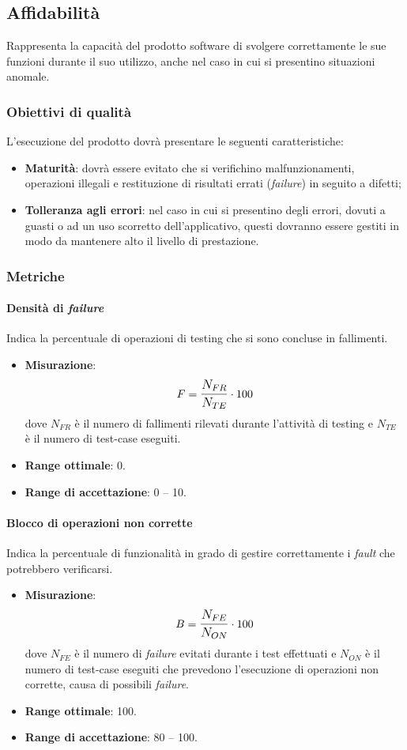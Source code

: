 \subsection{Affidabilità}
Rappresenta la capacità del prodotto software di svolgere correttamente le sue funzioni durante il suo utilizzo, anche nel caso in cui si presentino situazioni anomale.

\subsubsection{Obiettivi di qualità}
L'esecuzione del prodotto dovrà presentare le seguenti caratteristiche:
\begin{itemize}
\item \textbf{Maturità}: dovrà essere evitato che si verifichino malfunzionamenti, operazioni illegali e restituzione di risultati errati (\textit{failure}) in seguito a difetti;
\item \textbf{Tolleranza agli errori}: nel caso in cui si presentino degli errori, dovuti a guasti o ad un uso scorretto dell'applicativo, questi dovranno essere gestiti in modo da mantenere alto il livello di prestazione.
\end{itemize}

\subsubsection{Metriche}
\paragraph{Densità di \textit{failure}}
Indica la percentuale di operazioni di testing che si sono concluse in fallimenti.

\begin{itemize}
	\item \textbf{Misurazione}: 
		$$F=\mathlarger{\frac{N_{FR}}{N_{TE}}} \cdot 100$$
	dove $N_{FR}$ è il numero di fallimenti rilevati durante l'attività di testing e $N_{TE}$ è il numero di test-case eseguiti.
	\item \textbf{Range ottimale}: 0.
	\item \textbf{Range di accettazione}: 0 -- 10.
\end{itemize}

\paragraph{Blocco di operazioni non corrette}
Indica la percentuale di funzionalità in grado di gestire correttamente i \textit{fault} che potrebbero verificarsi.
\begin{itemize}
	\item \textbf{Misurazione}: 
		$$B=\mathlarger{\frac{N_{FE}}{N_{ON}}} \cdot 100$$
	dove $N_{FE}$ è il numero di \textit{failure} evitati durante i test effettuati e $N_{ON}$ è il numero di test-case eseguiti che prevedono l'esecuzione di operazioni non corrette, causa di possibili \textit{failure}.
	\item \textbf{Range ottimale}: 100.
	\item \textbf{Range di accettazione}: 80 -- 100.
\end{itemize}

